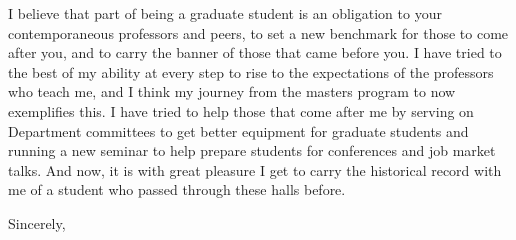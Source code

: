 \documentclass{letter}
\begin{document}
\begin{letter}
I believe that part of being a graduate student is an obligation to your contemporaneous professors and peers, to set a new benchmark for those to come after you, and to carry  the banner of those that came before you.  I have tried to the best of my ability at every step to rise to the expectations of the professors who teach me, and I think my journey from the masters program to now exemplifies this. I have tried to help those that come after me by serving on Department committees to get better equipment for graduate students and running a new seminar to help prepare students for conferences and job market talks. And now, it is with great pleasure I get to carry the historical record with me of a student who passed through these halls before.

\closing{Sincerely,}


\end{letter}
\end{document}
